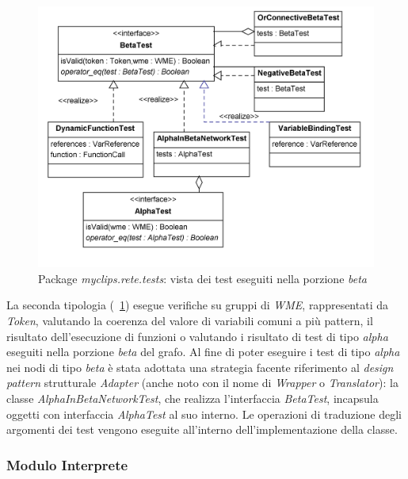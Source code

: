 \begin{figure}[h]
\centering
\includegraphics[width=1\textwidth]{Immagini/Capitolo3/Classi/myclips_rete_tests_Beta.png}
\caption{Package \emph{myclips.rete.tests}: vista dei test eseguiti nella porzione \emph{beta}}\label{fig:class-myclips-rete-tests-beta}
\end{figure}

La seconda tipologia (\figurename~\ref{fig:class-myclips-rete-tests-beta}) esegue verifiche su gruppi di \emph{WME}, rappresentati da \emph{Token}, valutando la coerenza del valore di variabili comuni a più pattern, il risultato dell'esecuzione di funzioni o valutando i risultato di test di tipo \emph{alpha} eseguiti nella porzione \emph{beta} del grafo. Al fine di poter eseguire i test di tipo \emph{alpha} nei nodi di tipo \emph{beta} è stata adottata una strategia facente riferimento al \emph{design pattern} strutturale \emph{Adapter} (anche noto con il nome di \emph{Wrapper} o \emph{Translator}): la classe \emph{AlphaInBetaNetworkTest}, che realizza l'interfaccia \emph{BetaTest}, incapsula oggetti con interfaccia \emph{AlphaTest} al suo interno. Le operazioni di traduzione degli argomenti dei test vengono eseguite all'interno dell'implementazione della classe.



\clearpage

\subsubsection{Modulo Interprete}

